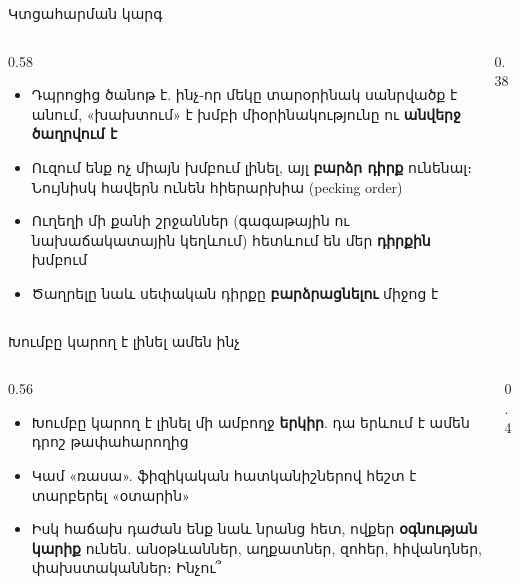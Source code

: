 \begin{frame}{Կտցահարման կարգ}
  \begin{columns}[c]
    \begin{column}{0.58\textwidth}
      \begin{itemize}
        \item Դպրոցից ծանոթ է. ինչ-որ մեկը տարօրինակ սանրվածք է անում, «խախտում» է խմբի միօրինակությունը ու \textbf{անվերջ ծաղրվում է}
        \item<2-> Ուզում ենք ոչ միայն խմբում լինել, այլ \textbf{բարձր դիրք} ունենալ։ Նույնիսկ հավերն ունեն հիերարխիա (pecking order)
        \item<3-> Ուղեղի մի քանի շրջաններ (գագաթային ու նախաճակատային կեղևում) հետևում են մեր \textbf{դիրքին} խմբում
        \item<4-> Ծաղրելը նաև սեփական դիրքը \textbf{բարձրացնելու} միջոց է
      \end{itemize}
    \end{column}
    \begin{column}{0.38\textwidth}
      \centering
      \ \par\medskip
    \end{column}
  \end{columns}
\end{frame}

\begin{frame}{Խումբը կարող է լինել ամեն ինչ}
  \begin{columns}[T]
    \begin{column}{0.56\textwidth}
      \begin{itemize}
        \item Խումբը կարող է լինել մի ամբողջ \textbf{երկիր}. դա երևում է ամեն դրոշ թափահարողից
        \item<2-> Կամ «ռասա». ֆիզիկական հատկանիշներով հեշտ է տարբերել «օտարին»
        \item<4-> Իսկ հաճախ դաժան ենք նաև նրանց հետ, ովքեր \textbf{օգնության կարիք} ունեն. անօթևաններ, աղքատներ, զոհեր, հիվանդներ, փախստականներ։ Ինչու՞
      \end{itemize}
    \end{column}
    \begin{column}{0.4\textwidth}
    \end{column}
  \end{columns}
\end{frame}

